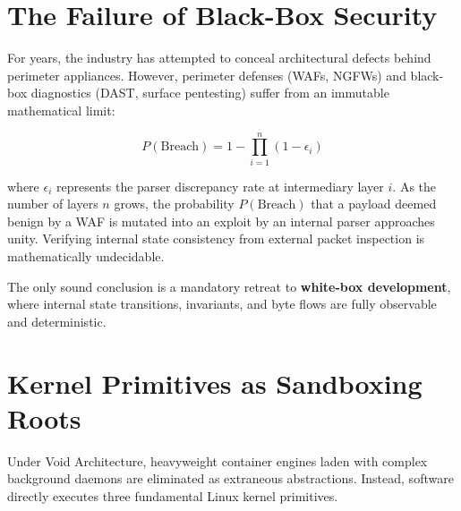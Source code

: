 \documentclass[10pt,a4paper,twocolumn]{article}
\newif\ifja
\begin{document}
\section{
\ifja ブラックボックスセキュリティの破綻 \else The Failure of Black-Box Security \fi
}
\ifja
セキュリティ業界は長年、この抽象化の歪みを「外付けの防御壁」で覆い隠そうとしてきた。しかし、境界防御（WAF、次世代FW）やブラックボックス診断（DAST、外部侵入テスト）には原理的限界が存在する。

\begin{equation}
    P(\text{Breach}) = 1 - \prod_{i=1}^{n} (1 - \epsilon_i)
\end{equation}

ここで、$\epsilon_i$ はレイヤー $i$ におけるパーサの不整合率である。レイヤー数 $n$ が増加するほど、外部WAFが「安全」と判定したパケットが内部ランタイムで悪意ある解釈へと変異する確率 $P(\text{Breach})$ は $1$ に収束する。外部からのパケット検査によって内部状態の論理的整合性を保証することは、計算量理論的にも不可能である。

セキュリティを担保するための唯一の論理的帰結は、\textbf{「内部状態・遷移規則・境界フローが100\%観測および検証可能なホワイトボックス開発」}への回帰である。
\else
For years, the industry has attempted to conceal architectural defects behind perimeter appliances. However, perimeter defenses (WAFs, NGFWs) and black-box diagnostics (DAST, surface pentesting) suffer from an immutable mathematical limit:

\begin{equation}
    P(\text{Breach}) = 1 - \prod_{i=1}^{n} (1 - \epsilon_i)
\end{equation}

where $\epsilon_i$ represents the parser discrepancy rate at intermediary layer $i$. As the number of layers $n$ grows, the probability $P(\text{Breach})$ that a payload deemed benign by a WAF is mutated into an exploit by an internal parser approaches unity. Verifying internal state consistency from external packet inspection is mathematically undecidable.

The only sound conclusion is a mandatory retreat to \textbf{white-box development}, where internal state transitions, invariants, and byte flows are fully observable and deterministic.
\fi

\section{
\ifja カーネルプリミティブによるサンドボックス基盤 \else Kernel Primitives as Sandboxing Roots \fi
}
\ifja
Void Architecture\texttrademark においては、数万行のコードと常駐デーモンを抱える重量級コンテナエンジンすら不要な抽象化として排除する。Linuxカーネルが数十年提供し続けている以下の3つの純粋なプリミティブを直接行使する。
\else
Under Void Architecture\texttrademark, heavyweight container engines laden with complex background daemons are eliminated as extraneous abstractions. Instead, software directly executes three fundamental Linux kernel primitives.
\fi
\end{document}
